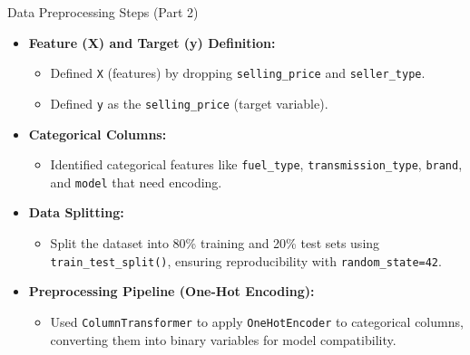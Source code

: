 \documentclass{beamer}
\begin{document}
\begin{frame}{Data Preprocessing Steps (Part 2)}
    \begin{itemize}
        \item \textbf{Feature (X) and Target (y) Definition:}
        \begin{itemize}
            \item Defined \texttt{X} (features) by dropping \texttt{selling\_price} and \texttt{seller\_type}.
            \item Defined \texttt{y} as the \texttt{selling\_price} (target variable).
        \end{itemize}
        
        \item \textbf{Categorical Columns:}
        \begin{itemize}
            \item Identified categorical features like \texttt{fuel\_type}, \texttt{transmission\_type}, \texttt{brand}, and \texttt{model} that need encoding.
        \end{itemize}
        
        \item \textbf{Data Splitting:}
        \begin{itemize}
            \item Split the dataset into 80\% training and 20\% test sets using \texttt{train\_test\_split()}, ensuring reproducibility with \texttt{random\_state=42}.
        \end{itemize}
        
        \item \textbf{Preprocessing Pipeline (One-Hot Encoding):}
        \begin{itemize}
            \item Used \texttt{ColumnTransformer} to apply \texttt{OneHotEncoder} to categorical columns, converting them into binary variables for model compatibility.
        \end{itemize}
    \end{itemize}
\end{frame}
\end{document}
